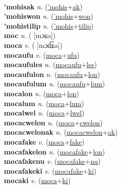 \label{'mohis} \\
\textbf{'mohisak} \textit{n.} (\hyperref['mohis]{'mohis}+\hyperref[ak]{ak})
 \label{'mohisak} \\
\textbf{'mohiswon} \textit{n.} (\hyperref['mohis]{'mohis}+\hyperref[won]{won})
 \label{'mohiswon} \\
\textbf{'mohistilip} \textit{n.} (\hyperref['mohis]{'mohis}+\hyperref[tilip]{tilip})
 \label{'mohistilip} \\
\textbf{moc} \textit{n.} ( [mɔɕa])
 \label{moc} \\
\textbf{moca} \textit{v.} ( [mɔd͡ʑa])
 \label{moca} \\
\textbf{mocaufu} \textit{v.} (\hyperref[moca]{moca}+\hyperref[ufu]{ufu})
 \label{mocaufu} \\
\textbf{mocaufules} \textit{n.} (\hyperref[mocaufu]{mocaufu}+\hyperref[les]{les})
 \label{mocaufules} \\
\textbf{mocaufulon} \textit{n.} (\hyperref[mocaufu]{mocaufu}+\hyperref[lon]{lon})
 \label{mocaufulon} \\
\textbf{mocaufulum} \textit{n.} (\hyperref[mocaufu]{mocaufu}+\hyperref[lum]{lum})
 \label{mocaufulum} \\
\textbf{mocalon} \textit{n.} (\hyperref[moca]{moca}+\hyperref[lon]{lon})
 \label{mocalon} \\
\textbf{mocalum} \textit{n.} (\hyperref[moca]{moca}+\hyperref[lum]{lum})
 \label{mocalum} \\
\textbf{mocalwel} \textit{n.} (\hyperref[moca]{moca}+\hyperref[lwel]{lwel})
 \label{mocalwel} \\
\textbf{mocacwelon} \textit{n.} (\hyperref[moca]{moca}+\hyperref[cwelon]{cwelon})
 \label{mocacwelon} \\
\textbf{mocacwelonak} \textit{n.} (\hyperref[mocacwelon]{mocacwelon}+\hyperref[ak]{ak})
 \label{mocacwelonak} \\
\textbf{mocafake} \textit{v.} (\hyperref[moca]{moca}+\hyperref[fake]{fake})
 \label{mocafake} \\
\textbf{mocafakelon} \textit{n.} (\hyperref[mocafake]{mocafake}+\hyperref[lon]{lon})
 \label{mocafakelon} \\
\textbf{mocafakenu} \textit{v.} (\hyperref[mocafake]{mocafake}+\hyperref[nu]{nu})
 \label{mocafakenu} \\
\textbf{mocafakeki} \textit{v.} (\hyperref[mocafake]{mocafake}+\hyperref[ki]{ki})
 \label{mocafakeki} \\
\textbf{mocaki} \textit{v.} (\hyperref[moca]{moca}+\hyperref[ki]{ki})
